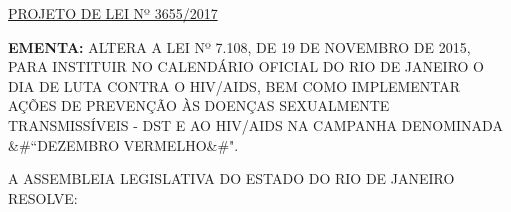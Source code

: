 \documentclass[10pt]{article}
\date{}
\begin{document}
\maketitle
\begin{center}
  \huge
  \vspace{-3cm}\href{http://alerjln1.alerj.rj.gov.br/scpro1519.nsf/f4b46b3cdbba990083256cc900746cf6/04bc8bb81e187805832581d8005de236?OpenDocument}{PROJETO DE LEI Nº 3655/2017}
\bigskip
\bigskip
\bigskip
  
\end{center}

\textbf{EMENTA:} 
ALTERA A LEI Nº 7.108, DE 19 DE NOVEMBRO DE 2015, PARA INSTITUIR NO CALENDÁRIO OFICIAL DO RIO DE JANEIRO O DIA  DE LUTA CONTRA O HIV/AIDS, BEM COMO IMPLEMENTAR AÇÕES DE PREVENÇÃO ÀS DOENÇAS SEXUALMENTE TRANSMISSÍVEIS  - DST E AO HIV/AIDS NA CAMPANHA DENOMINADA &#``DEZEMBRO VERMELHO&#".








\bigskip

\noindent
A ASSEMBLEIA LEGISLATIVA DO ESTADO DO RIO DE JANEIRO RESOLVE:
\end{document}
